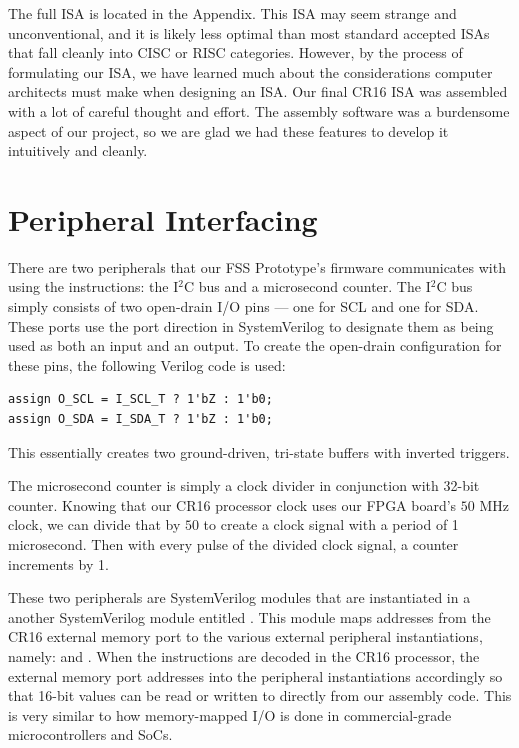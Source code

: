 \documentclass[conference]{IEEEtran}
\begin{document}
 The full ISA is located in the Appendix. This ISA may seem strange and unconventional, and it is likely less optimal than most standard accepted ISAs that fall cleanly into CISC or RISC categories. However, by the process of formulating our ISA, we have learned much about the considerations computer architects must make when designing an ISA. Our final CR16 ISA was assembled with a lot of careful thought and effort. The assembly software was a burdensome aspect of our project, so we are glad we had these features to develop it intuitively and cleanly.

\section{Peripheral Interfacing}
There are two peripherals that our FSS Prototype's firmware communicates with using the  instructions: the I$^2$C bus and a microsecond counter. The I$^2$C bus simply consists of two open-drain I/O pins --- one for SCL and one for SDA. These ports use the  port direction in SystemVerilog to designate them as being used as both an input and an output. To create the open-drain configuration for these pins, the following Verilog code is used:
\begin{verbatim}
assign O_SCL = I_SCL_T ? 1'bZ : 1'b0;
assign O_SDA = I_SDA_T ? 1'bZ : 1'b0;
\end{verbatim}
This essentially creates two ground-driven, tri-state buffers with inverted triggers.

The microsecond counter is simply a clock divider in conjunction with 32-bit counter. Knowing that our CR16 processor clock uses our FPGA board's $50$ MHz clock, we can divide that by $50$ to create a clock signal with a period of 1 microsecond. Then with every pulse of the divided clock signal, a counter increments by 1.

These two peripherals are SystemVerilog modules that are instantiated in a another SystemVerilog module entitled . This module maps addresses from the CR16 external memory port to the various external peripheral instantiations, namely:  and . When the  instructions are decoded in the CR16 processor, the external memory port addresses into the peripheral instantiations accordingly so that 16-bit values can be read or written to directly from our assembly code. This is very similar to how memory-mapped I/O is done in commercial-grade microcontrollers and SoCs.
\end{document}

